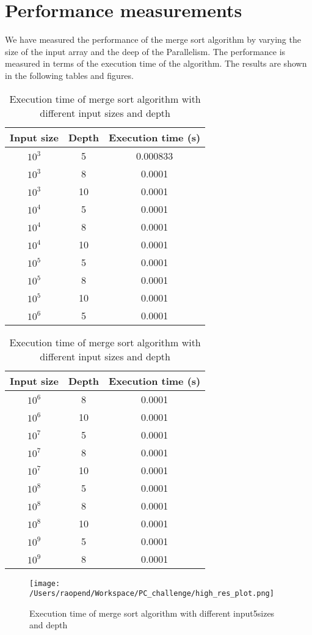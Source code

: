 \documentclass[a4paper,12pt]{report}
\begin{document}
\section*{Performance measurements}
We have measured the performance of the merge sort algorithm by varying the size of the input array and the deep of the Parallelism. The performance is measured in terms of the execution time of the algorithm. The results are shown in the following tables and figures.
\begin{table}[H]
    \caption{Execution time of merge sort algorithm with different input sizes and depth}
    \centering
    \begin{tabular}{c c c}
        \hline
        Input size & Depth & Execution time (s) \\
        \hline
        $10^3$     & 5     & 0.000833           \\
        $10^3$     & 8     & 0.0001             \\
        $10^3$     & 10    & 0.0001             \\
        $10^4$     & 5     & 0.0001             \\
        $10^4$     & 8     & 0.0001             \\
        $10^4$     & 10    & 0.0001             \\
        $10^5$     & 5     & 0.0001             \\
        $10^5$     & 8     & 0.0001             \\
        $10^5$     & 10    & 0.0001             \\
        $10^6$     & 5     & 0.0001             \\
        \hline
    \end{tabular}
    \hfil
    \begin{tabular}{c c c}
        \hline
        Input size & Depth & Execution time (s) \\
        \hline
        $10^6$     & 8     & 0.0001             \\
        $10^6$     & 10    & 0.0001             \\
        $10^7$     & 5     & 0.0001             \\
        $10^7$     & 8     & 0.0001             \\
        $10^7$     & 10    & 0.0001             \\
        $10^8$     & 5     & 0.0001             \\
        $10^8$     & 8     & 0.0001             \\
        $10^8$     & 10    & 0.0001             \\
        $10^9$     & 5     & 0.0001             \\
        $10^9$     & 8     & 0.0001             \\
        \hline
    \end{tabular}
\end{table}
\begin{figure}[H]
    \centering
    \texttt{[image: /Users/raopend/Workspace/PC\_challenge/high\_res\_plot.png]}
    \caption{Execution time of merge sort algorithm with different input5sizes and depth}
\end{figure}
\end{document}
